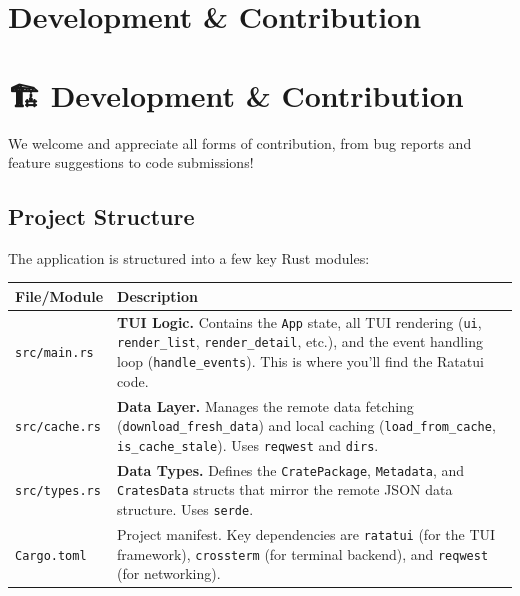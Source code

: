 \documentclass[
  letterpaper,
  DIV=11,
  numbers=noendperiod]{scrreprt}
\begin{document}
\chapter{Development \& Contribution}\label{development-contribution}

\chapter{🏗️ Development \&
Contribution}\label{development-contribution-1}

We welcome and appreciate all forms of contribution, from bug reports
and feature suggestions to code submissions!

\section{Project Structure}\label{project-structure}

The application is structured into a few key Rust modules:

\begin{longtable}[]{@{}
  >{\raggedright\arraybackslash}p{}
  >{\raggedright\arraybackslash}p{}@{}}
\toprule\noalign{}
\begin{minipage}[b]{\linewidth}\raggedright
File/Module
\end{minipage} & \begin{minipage}[b]{\linewidth}\raggedright
Description
\end{minipage} \\
\midrule\noalign{}
\endhead
\bottomrule\noalign{}
\endlastfoot
\texttt{src/main.rs} & \textbf{TUI Logic.} Contains the \texttt{App}
state, all TUI rendering (\texttt{ui}, \texttt{render\_list},
\texttt{render\_detail}, etc.), and the event handling loop
(\texttt{handle\_events}). This is where you'll find the Ratatui
code. \\
\texttt{src/cache.rs} & \textbf{Data Layer.} Manages the remote data
fetching (\texttt{download\_fresh\_data}) and local caching
(\texttt{load\_from\_cache}, \texttt{is\_cache\_stale}). Uses
\texttt{reqwest} and \texttt{dirs}. \\
\texttt{src/types.rs} & \textbf{Data Types.} Defines the
\texttt{CratePackage}, \texttt{Metadata}, and \texttt{CratesData}
structs that mirror the remote JSON data structure. Uses
\texttt{serde}. \\
\texttt{Cargo.toml} & Project manifest. Key dependencies are
\texttt{ratatui} (for the TUI framework), \texttt{crossterm} (for
terminal backend), and \texttt{reqwest} (for networking). \\
\end{longtable}
\end{document}
